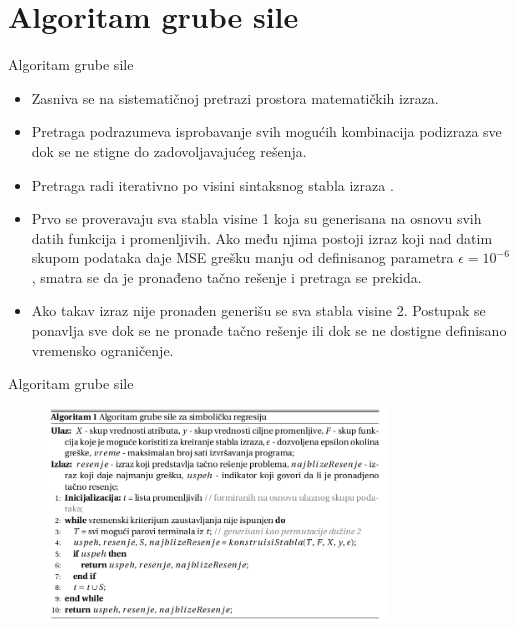 \documentclass{beamer}
\begin{document}
\section{Algoritam grube sile}
\begin{frame}{Algoritam grube sile}
\begin{itemize}
    \item Zasniva se na sistematičnoj pretrazi prostora matematičkih izraza.
    \item Pretraga podrazumeva isprobavanje svih mogućih kombinacija podizraza sve dok se ne stigne do zadovoljavajućeg rešenja.
    \item Pretraga radi iterativno po visini sintaksnog stabla izraza \cite{AIFeynman}.
    \item Prvo se proveravaju sva stabla visine 1 koja su generisana na osnovu svih datih funkcija i promenljivih. Ako među njima postoji izraz koji nad datim skupom podataka daje MSE grešku manju od definisanog parametra $\epsilon = 10^{-6}$, smatra se da je pronađeno tačno rešenje i pretraga se prekida. 
    \item Ako takav izraz nije pronađen generišu se sva stabla visine 2. Postupak se ponavlja sve dok se ne pronađe tačno rešenje ili dok se ne dostigne definisano vremensko ograničenje.
\end{itemize}
\end{frame}

\begin{frame}[fragile]{Algoritam grube sile}
\begin{figure}[!ht]
\begin{center}
\includegraphics[width=0.80\textwidth]{images/brute_force_alg_1.png}
\end{center}
\label{fig:polyReg}
\end{figure}
\end{frame}
\end{document}
